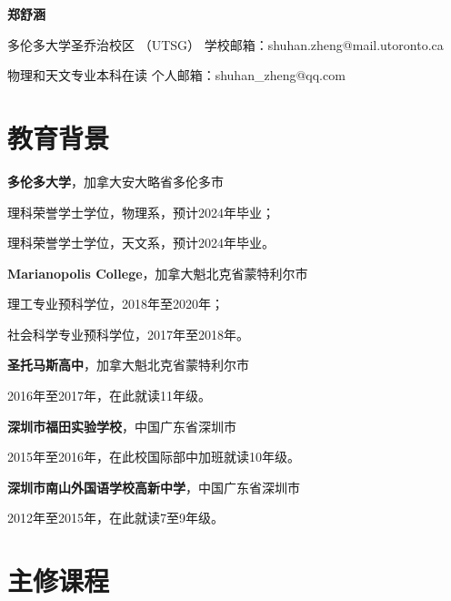 \documentclass{article}
\begin{document}

\begin{center}
  \Huge{\textbf{郑舒涵}}
\end{center}

\noindent 多伦多大学圣乔治校区 （UTSG） \hfill 学校邮箱：shuhan.zheng@mail.utoronto.ca

\noindent 物理和天文专业本科在读 \hfill 个人邮箱：shuhan\_zheng@qq.com

\setlength{\parskip}{3pt}

\section{教育背景}
\indent

\hspace{2em}\textbf{多伦多大学}，加拿大安大略省多伦多市

\hspace{4em}理科荣誉学士学位，物理系，预计2024年毕业；

\hspace{4em}理科荣誉学士学位，天文系，预计2024年毕业。

\hspace{2em}\textbf{Marianopolis College}，加拿大魁北克省蒙特利尔市

\hspace{4em}理工专业预科学位，2018年至2020年；

\hspace{4em}社会科学专业预科学位，2017年至2018年。

\hspace{2em}\textbf{圣托马斯高中}，加拿大魁北克省蒙特利尔市

\hspace{4em}2016年至2017年，在此就读11年级。

\hspace{2em}\textbf{深圳市福田实验学校}，中国广东省深圳市

\hspace{4em}2015年至2016年，在此校国际部中加班就读10年级。

\hspace{2em}\textbf{深圳市南山外国语学校高新中学}，中国广东省深圳市

\hspace{4em}2012年至2015年，在此就读7至9年级。

\section{主修课程}
\indent
\end{document}
